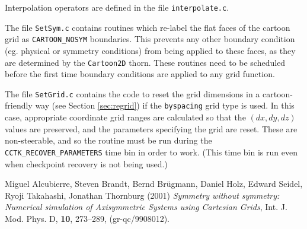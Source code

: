 \documentclass{article}
\begin{document}
Interpolation operators are defined in the file
\texttt{interpolate.c}.

The file \texttt{SetSym.c} contains routines which re-label the flat
faces of the cartoon grid as \texttt{CARTOON\_NOSYM} boundaries. This
prevents any other boundary condition (eg. physical or symmetry
conditions) from being applied to these faces, as they are determined
by the \texttt{Cartoon2D} thorn. These routines need to be scheduled
before the first time boundary conditions are applied to any grid
function.

The file \texttt{SetGrid.c} contains the code to reset the grid
dimensions in a cartoon-friendly way (see Section \ref{sec:regrid}) if
the \texttt{byspacing} grid type is used. In this case, appropriate
coordinate grid ranges are calculated so that the $(dx,dy,dz)$ values
are preserved, and the parameters specifying the grid are reset. These
are non-steerable, and so the routine must be run during the
\texttt{CCTK\_RECOVER\_PARAMETERS} time bin in order to work. (This time
bin is run even when checkpoint recovery is not being used.)

\begin{thebibliography}{9}
    Miguel Alcubierre, Steven Brandt, Bernd Br\"ugmann, Daniel Holz,
    Edward Seidel, Ryoji Takahashi, Jonathan Thornburg (2001)
    \emph{Symmetry without symmetry: Numerical simulation of
    Axisymmetric Systems using Cartesian Grids}, Int. J. Mod. Phys. D,
    \textbf{10}, 273--289, (gr-qc/9908012).
\end{thebibliography}

\end{document}
